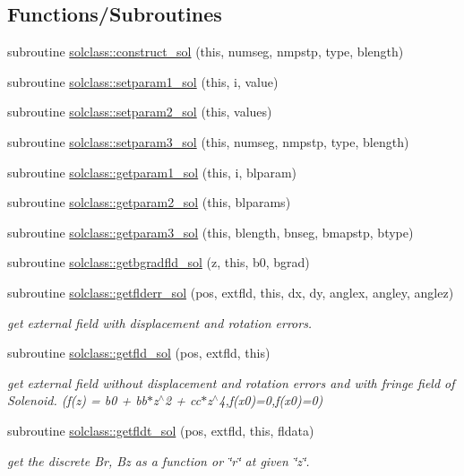 \subsection*{Functions/\+Subroutines}
\begin{DoxyCompactItemize}
\item 
subroutine \mbox{\hyperlink{namespacesolclass_a2307b36cefac8604240e62757dd08cb9}{solclass\+::construct\+\_\+sol}} (this, numseg, nmpstp, type, blength)
\item 
subroutine \mbox{\hyperlink{namespacesolclass_aaec011d4f25d3b03a7e0b42beaa7c9db}{solclass\+::setparam1\+\_\+sol}} (this, i, value)
\item 
subroutine \mbox{\hyperlink{namespacesolclass_a8f2eac99c954759e1b3b6094d8f502fb}{solclass\+::setparam2\+\_\+sol}} (this, values)
\item 
subroutine \mbox{\hyperlink{namespacesolclass_a05dc05d4a94a2e1a71280ff983e62c3e}{solclass\+::setparam3\+\_\+sol}} (this, numseg, nmpstp, type, blength)
\item 
subroutine \mbox{\hyperlink{namespacesolclass_a68e03415e9802b36da3ec9bae72f41b7}{solclass\+::getparam1\+\_\+sol}} (this, i, blparam)
\item 
subroutine \mbox{\hyperlink{namespacesolclass_aab6c073c4b20670742987b17bcb8366d}{solclass\+::getparam2\+\_\+sol}} (this, blparams)
\item 
subroutine \mbox{\hyperlink{namespacesolclass_a11962a787b8bed31dd906ac4a5e2853e}{solclass\+::getparam3\+\_\+sol}} (this, blength, bnseg, bmapstp, btype)
\item 
subroutine \mbox{\hyperlink{namespacesolclass_ad89ee3db004c00d4f2e128ddbf03ce32}{solclass\+::getbgradfld\+\_\+sol}} (z, this, b0, bgrad)
\item 
subroutine \mbox{\hyperlink{namespacesolclass_a571ab7b6c8ce4dd9e7eaa2489b874682}{solclass\+::getflderr\+\_\+sol}} (pos, extfld, this, dx, dy, anglex, angley, anglez)
\begin{DoxyCompactList}\small\item\em get external field with displacement and rotation errors. \end{DoxyCompactList}\item 
subroutine \mbox{\hyperlink{namespacesolclass_a7a865f7ab4470f9bff328ed98aacd7c8}{solclass\+::getfld\+\_\+sol}} (pos, extfld, this)
\begin{DoxyCompactList}\small\item\em get external field without displacement and rotation errors and with fringe field of Solenoid. (f(z) = b0 + bb$\ast$z$^\wedge$2 + cc$\ast$z$^\wedge$4,f(x0)=0,f\textquotesingle{}(x0)=0) \end{DoxyCompactList}\item 
subroutine \mbox{\hyperlink{namespacesolclass_ae8d2c14b13bdf023c1a9efb101b4c666}{solclass\+::getfldt\+\_\+sol}} (pos, extfld, this, fldata)
\begin{DoxyCompactList}\small\item\em get the discrete Br, Bz as a function or \char`\"{}r\char`\"{} at given \char`\"{}z\char`\"{}. \end{DoxyCompactList}\end{DoxyCompactItemize}

